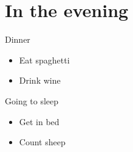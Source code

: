 \documentclass[
  ignorenonframetext,
]{beamer}
\providecommand{\tightlist}{%
  \setlength{\itemsep}{0pt}\setlength{\parskip}{0pt}}\usepackage{longtable,booktabs,array}
\begin{document}
\section{In the evening}\label{in-the-evening}

\begin{frame}{Dinner}
\label{dinner}
\begin{itemize}[<+->]
\tightlist
\item
  Eat spaghetti
\item
  Drink wine
\end{itemize}
\end{frame}

\begin{frame}{Going to sleep}
\label{going-to-sleep}
\begin{itemize}[<+->]
\tightlist
\item
  Get in bed
\item
  Count sheep
\end{itemize}
\end{frame}
\end{document}
